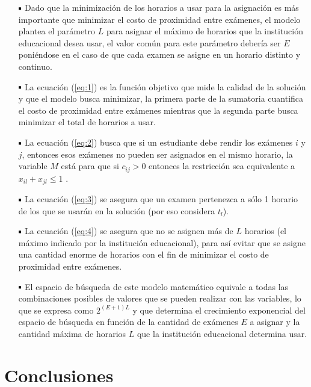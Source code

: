\documentclass[letter, 10pt]{article}
\newcommand*\sq{\mathbin{\vcenter{\hbox{\rule{.7ex}{.7ex}}}}}
\begin{document}
\begin{itemize}
	\item[$\sq$] Dado que la minimización de los horarios a usar para la asignación es más importante que minimizar el costo de proximidad entre exámenes, el modelo plantea el parámetro $L$ para asignar el máximo de horarios que la institución educacional desea usar, el valor común para este parámetro debería ser $E$ poniéndose en el caso de que cada examen se asigne en un horario distinto y continuo.

	\item[$\sq$] La ecuación (\ref{eq:1}) es la función objetivo que mide la calidad de la solución y que el modelo busca minimizar, la primera parte de la sumatoria cuantifica el costo de proximidad entre exámenes mientras que la segunda parte busca minimizar el total de horarios a usar.
	
	\item[$\sq$] La ecuación (\ref{eq:2}) busca que si un estudiante debe rendir los exámenes $i$ y $j$, entonces esos exámenes no pueden ser asignados en el mismo horario, la variable $M$ está para que si $c_{ij} > 0$ entonces la restricción sea equivalente a $x_{il} + x_{jl} \leq 1$ \cite{LAPORTE1984351}.

	\item[$\sq$] La ecuación (\ref{eq:3}) se asegura que un examen pertenezca a sólo 1 horario de los que se usarán en la solución (por eso considera $t_{l}$).

	\item[$\sq$] La ecuación (\ref{eq:4}) se asegura que no se asignen más de $L$ horarios (el máximo indicado por la institución educacional), para así evitar que se asigne una cantidad enorme de horarios con el fin de minimizar el costo de proximidad entre exámenes.

	\item[$\sq$] El espacio de búsqueda de este modelo matemático equivale a todas las combinaciones posibles de valores que se pueden realizar con las variables, lo que se expresa como $2^{(E + 1)L}$ y que determina el crecimiento exponencial del espacio de búsqueda en función de la cantidad de exámenes $E$ a asignar y la cantidad máxima de horarios $L$ que la institución educacional determina usar.
\end{itemize}

\section{Conclusiones} \label{conclusiones}
\end{document}
